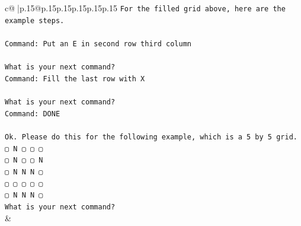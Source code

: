 \documentclass{article}
\begin{document}
{\begin{supertabular}{c@{$\;$}|p{.15\linewidth}@{}p{.15\linewidth}p{.15\linewidth}p{.15\linewidth}p{.15\linewidth}p{.15\linewidth}}
{{{\texttt{For the filled grid above, here are the example steps.} \\
\\ 
\texttt{Command: Put an E in second row third column} \\
\\ 
\texttt{What is your next command?} \\
\texttt{Command: Fill the last row with X} \\
\\ 
\texttt{What is your next command?} \\
\texttt{Command: DONE} \\
\\ 
\texttt{Ok. Please do this for the following example, which is a 5 by 5 grid.} \\
\texttt{▢ N ▢ ▢ ▢} \\
\texttt{▢ N ▢ ▢ N} \\
\texttt{▢ N N N ▢} \\
\texttt{▢ ▢ ▢ ▢ ▢} \\
\texttt{▢ N N N ▢} \\
\texttt{What is your next command?} \\
            }
        }
    }
    & \\ \\


\end{supertabular}}
\end{document}
